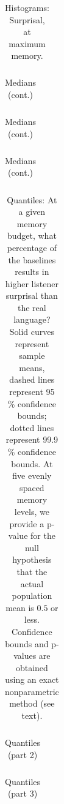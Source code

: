 \documentclass[11pt,letterpaper]{article}
\begin{document}
\begin{table}
\begin{longtable}{ccccccccccccccclll}

\end{longtable}
	\caption{Histograms: Surprisal, at maximum memory.}\label{tab:slice-hists-real}
\end{table}

\begin{table}
\begin{longtable}{ccccccccccccccclll}

\end{longtable}
	\caption{Medians (cont.)}
\end{table}

\begin{table}
\begin{longtable}{ccccccccccccccclll}

\end{longtable}
	\caption{Medians (cont.)}
\end{table}

\begin{table}
\begin{longtable}{ccccccccccccccclll}

\end{longtable}
	\caption{Medians (cont.)}
\end{table}


\begin{table}
\begin{longtable}{cccccccccccccccccc}

\end{longtable}
	\caption{Quantiles: At a given memory budget, what percentage of the baselines results in higher listener surprisal than the real language? Solid curves represent sample means, dashed lines represent 95 \% confidence bounds; dotted lines represent 99.9 \% confidence bounds. At five evenly spaced memory levels, we provide a p-value for the null hypothesis that the actual population mean is $0.5$ or less. Confidence bounds and p-values are obtained using an exact nonparametric method (see text).}\label{tab:quantiles}
\end{table}

\begin{table}
\begin{longtable}{cccccccccccccccccc}

\end{longtable}
	\caption{Quantiles (part 2)}
\end{table}

\begin{table}
\begin{longtable}{cccccccccccccccccc}

\end{longtable}
	\caption{Quantiles (part 3)}
\end{table}
\end{document}
